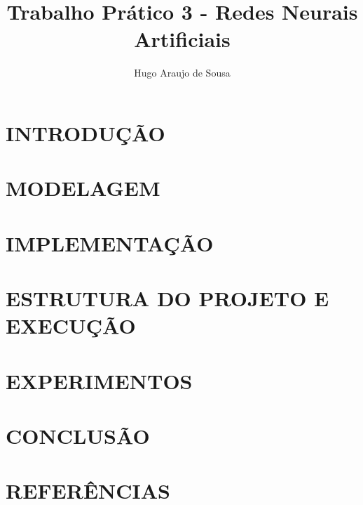 \documentclass[12pt]{article}
\title{Trabalho Prático 3 - Redes Neurais Artificiais}
\author{Hugo Araujo de Sousa}
\begin{document}
 

\maketitle
     
\begin{resumo}
  
\end{resumo}

\section{INTRODUÇÃO}



\section{MODELAGEM} \label{sec:model}



\section{IMPLEMENTAÇÃO}



\section{ESTRUTURA DO PROJETO E EXECUÇÃO}



\section{EXPERIMENTOS}



\section{CONCLUSÃO}



\section{REFERÊNCIAS}





\end{document}
